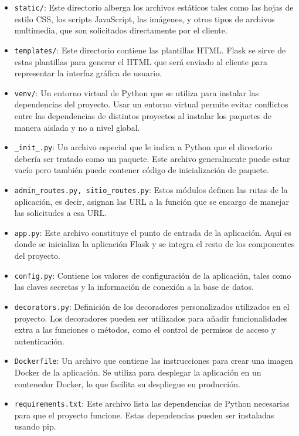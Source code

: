 \documentclass[a4paper, 12pt]{book}
\begin{document}
\begin{itemize}
  \item \texttt{static/}: Este directorio alberga los archivos estáticos tales como las hojas de estilo CSS, los scripts JavaScript, las imágenes, y otros tipos de 
  archivos multimedia, que son solicitados directamente por el cliente.
  \item \texttt{templates/}: Este directorio contiene las plantillas HTML. Flask se sirve de estas plantillas para generar el HTML que será enviado al cliente para 
  representar la interfaz gráfica de usuario.
  \item \texttt{venv/}: Un entorno virtual de Python que se utiliza para instalar las dependencias del proyecto. Usar un entorno virtual permite evitar conflictos 
  entre las dependencias de distintos proyectos al instalar los paquetes de manera aislada y no a nivel global.
  \item \texttt{\_init\_.py}: Un archivo especial que le indica a Python que el directorio debería ser tratado como un paquete. Este archivo generalmente puede estar 
  vacío pero también puede contener código de inicialización de paquete.
  \item \texttt{admin\_routes.py, sitio\_routes.py}: Estos módulos definen las rutas de la aplicación, es decir, asignan las URL a la función que se encargo de manejar 
  las solicitudes a esa URL.
  \item \texttt{app.py}: Este archivo constituye el punto de entrada de la aplicación. Aquí es donde se inicializa la aplicación Flask y se integra el resto de los componentes del proyecto.
  \item \texttt{config.py}: Contiene los valores de configuración de la aplicación, tales como las claves secretas y la información de conexión a la base de datos.
  \item \texttt{decorators.py}: Definición de los decoradores personalizados utilizados en el proyecto. Los decoradores pueden ser utilizados para añadir funcionalidades 
  extra a las funciones o métodos, como el control de permisos de acceso y autenticación.
  \item \texttt{Dockerfile}: Un archivo que contiene las instrucciones para crear una imagen Docker de la aplicación. Se utiliza para desplegar la aplicación en un 
  contenedor Docker, lo que facilita su despliegue en producción.
  \item \texttt{requirements.txt}: Este archivo lista las dependencias de Python necesarias para que el proyecto funcione. Estas dependencias pueden ser instaladas usando pip.
\end{itemize}
\end{document}
